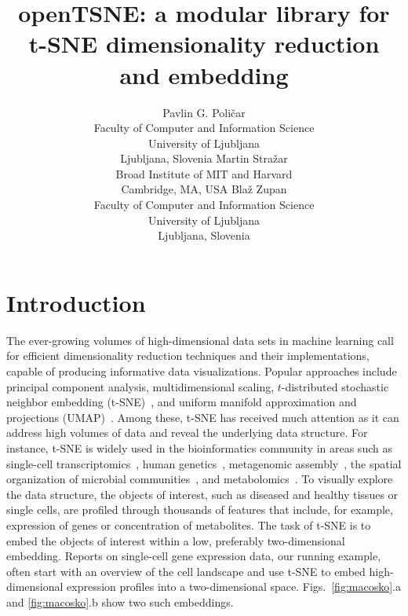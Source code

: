 \documentclass[article]{jss}
\author{
  Pavlin G. Poli\v{c}ar\\
  Faculty of Computer and Information Science\\
  University of Ljubljana\\
  Ljubljana, Slovenia
  \AND
  Martin Stra\v{z}ar\\
  Broad Institute of MIT and Harvard\\
  Cambridge, MA, USA
  \AND
  Bla\v{z} Zupan\\
  Faculty of Computer and Information Science\\
  University of Ljubljana\\
  Ljubljana, Slovenia
}
\title{openTSNE: a modular \proglang{Python} library for t-SNE dimensionality reduction and embedding}
\begin{document}


\section[Introduction]{Introduction} \label{sec:intro}

The ever-growing volumes of high-dimensional data sets in machine learning call for efficient dimensionality reduction techniques and their implementations, capable of producing informative data visualizations. Popular approaches include principal component analysis, multidimensional scaling, $t$-distributed stochastic neighbor embedding (t-SNE)~\citep{maaten2008visualizing}, and uniform manifold approximation and projections (UMAP)~\citep{2018arXivUMAP}. Among these, t-SNE has received much attention as it can address high volumes of data and reveal the underlying data structure. For instance, t-SNE is widely used in the bioinformatics community in areas such as single-cell transcriptomics~\citep{macosko2015highly,cao2019single,tasic2018shared}, human genetics~\citep{hirata2019genetic}, metagenomic assembly~\citep{beaulaurier2018metagenomic}, the spatial organization of microbial communities~\citep{sheth2019spatial}, and metabolomics~\citep{tkachev2019differences}. To visually explore the data structure, the objects of interest, such as diseased and healthy tissues or single cells, are profiled through thousands of features that include, for example, expression of genes or concentration of metabolites. The task of t-SNE is to embed the objects of interest within a low, preferably two-dimensional embedding. Reports on single-cell gene expression data, our running example, often start with an overview of the cell landscape and use t-SNE to embed high-dimensional expression profiles into a two-dimensional space. Figs.~\ref{fig:macosko}.a and \ref{fig:macosko}.b show two such embeddings.
\end{document}
